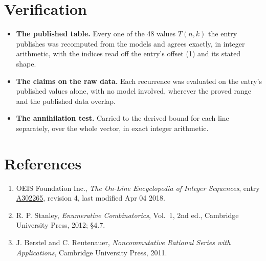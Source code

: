 \documentclass[11pt]{article}
\theoremstyle{definition}
\begin{document}
\section{Verification}

\begin{itemize}

\item {\bfseries The published table.} Every one of the 48 values $T(n,k)$ the entry publishes was recomputed from the models and agrees exactly, in integer arithmetic, with the indices read off the entry's offset (1) and its stated shape.

\item {\bfseries The claims on the raw data.} Each recurrence was evaluated on the entry's published values alone, with no model involved, wherever the proved range and the published data overlap.

\item {\bfseries The annihilation test.} Carried to the derived bound for each line separately, over the whole vector, in exact integer arithmetic.

\end{itemize}

\section{References}

\begin{enumerate}

\item OEIS Foundation Inc., \emph{The On-Line Encyclopedia of Integer Sequences}, entry \href{https://oeis.org/A302265}{A302265}, revision 4, last modified Apr 04 2018.

\item R. P. Stanley, \emph{Enumerative Combinatorics}, Vol.~1, 2nd ed., Cambridge University Press, 2012; \S4.7.

\item J. Berstel and C. Reutenauer, \emph{Noncommutative Rational Series with Applications}, Cambridge University Press, 2011.

\end{enumerate}
\end{document}

